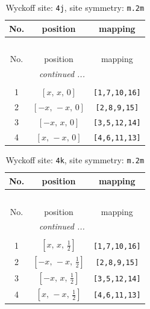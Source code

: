 \documentclass[fleqn,8pt]{jsarticle}
\begin{document}
\begin{longtable}{ccc}
\caption{Wyckoff site: {\tt 4j}, site symmetry: {\tt m.2m}}
 \\
 \hline \hline
No. & position & mapping \\ \hline \endfirsthead

\multicolumn{2}{l}{\tablename\ \thetable{}} \\
 \hline \hline
No. & position & mapping \\ \hline \endhead

 \hline \hline
\multicolumn{2}{r}{\footnotesize\it continued ...} \\ \endfoot

 \hline \hline
\multicolumn{2}{r}{} \\ \endlastfoot

1 & $\left[ x,\, x,\, 0 \right]$ & {\tt [1,7,10,16]} \\ \hline
2 & $\left[ - x,\, - x,\, 0 \right]$ & {\tt [2,8,9,15]} \\ \hline
3 & $\left[ - x,\, x,\, 0 \right]$ & {\tt [3,5,12,14]} \\ \hline
4 & $\left[ x,\, - x,\, 0 \right]$ & {\tt [4,6,11,13]} \\
\end{longtable}
\renewcommand{\arraystretch}{1.2}
\begin{longtable}{ccc}
\caption{Wyckoff site: {\tt 4k}, site symmetry: {\tt m.2m}}
 \\
 \hline \hline
No. & position & mapping \\ \hline \endfirsthead

\multicolumn{2}{l}{\tablename\ \thetable{}} \\
 \hline \hline
No. & position & mapping \\ \hline \endhead

 \hline \hline
\multicolumn{2}{r}{\footnotesize\it continued ...} \\ \endfoot

 \hline \hline
\multicolumn{2}{r}{} \\ \endlastfoot

1 & $\left[ x,\, x,\, \frac{1}{2} \right]$ & {\tt [1,7,10,16]} \\ \hline
2 & $\left[ - x,\, - x,\, \frac{1}{2} \right]$ & {\tt [2,8,9,15]} \\ \hline
3 & $\left[ - x,\, x,\, \frac{1}{2} \right]$ & {\tt [3,5,12,14]} \\ \hline
4 & $\left[ x,\, - x,\, \frac{1}{2} \right]$ & {\tt [4,6,11,13]} \\
\end{longtable}
\end{document}
